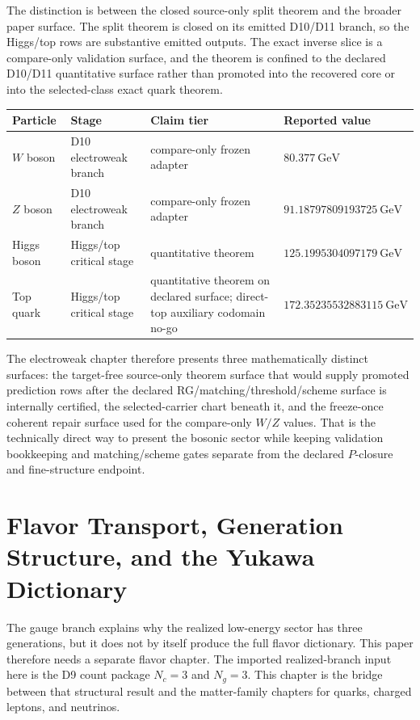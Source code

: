 \documentclass[11pt]{article}
\begin{document}
The distinction is between the closed source-only split theorem and the broader paper surface. The
split theorem is closed on its emitted D10/D11 branch, so the Higgs/top rows are
substantive emitted outputs. The exact inverse slice is a compare-only validation surface, and the theorem is confined to the declared D10/D11 quantitative surface rather than promoted into the recovered core or into the selected-class exact quark theorem.

\begin{table}[h]
\centering
\small
\begin{tabular}{@{}llll@{}}
\toprule
Particle & Stage & Claim tier & Reported value \\
\midrule
\(W\) boson & D10 electroweak branch & compare-only frozen adapter & \(80.377~\mathrm{GeV}\) \\
\(Z\) boson & D10 electroweak branch & compare-only frozen adapter & \(91.18797809193725~\mathrm{GeV}\) \\
Higgs boson & Higgs/top critical stage & quantitative theorem & \(125.1995304097179~\mathrm{GeV}\) \\
Top quark & Higgs/top critical stage & quantitative theorem on declared surface; direct-top auxiliary codomain no-go & \(172.35235532883115~\mathrm{GeV}\) \\
\bottomrule
\end{tabular}
\end{table}

The electroweak chapter therefore presents three mathematically distinct surfaces: the target-free
source-only theorem surface that would supply promoted prediction rows after the declared RG/matching/threshold/scheme surface is internally certified, the selected-carrier chart
beneath it, and the freeze-once coherent repair surface used for the compare-only \(W/Z\)
values. That is the technically direct way to present the bosonic sector while keeping validation
bookkeeping and matching/scheme gates separate from the declared \(P\)-closure and fine-structure
endpoint.

\section{Flavor Transport, Generation Structure, and the Yukawa Dictionary}

The gauge branch explains why the realized low-energy sector has three generations, but it does
not by itself produce the full flavor dictionary. This paper therefore needs a
separate flavor chapter. The imported realized-branch input here is the D9 count package
\(N_c=3\) and \(N_g=3\). This chapter is the bridge between that structural result and the
matter-family chapters for quarks, charged leptons, and neutrinos.
\end{document}
